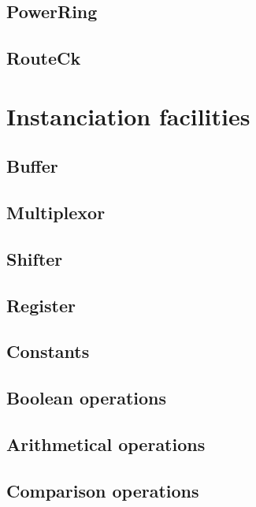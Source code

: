 \documentclass[11pt]{article}
\begin{document}
    \subsection{PowerRing}
    \label{secpowerring}
    
    \subsection{RouteCk}
    \label{secrouteck}
    

\section{Instanciation facilities}
\label{secfacilities}

    \subsection{Buffer}
    \label{secbuff}
    
    \subsection{Multiplexor}
    \label{secmux}
    
    \subsection{Shifter}
    \label{secshift}
    
    \subsection{Register}
    \label{secreg}
        
    \subsection{Constants}
    \label{secconstant}
        
    \subsection{Boolean operations}
    \label{secbool}
    
    \subsection{Arithmetical operations}
    \label{secarithmetic}
    
    \subsection{Comparison operations}
    \label{seccomp}
    
\end{document}
